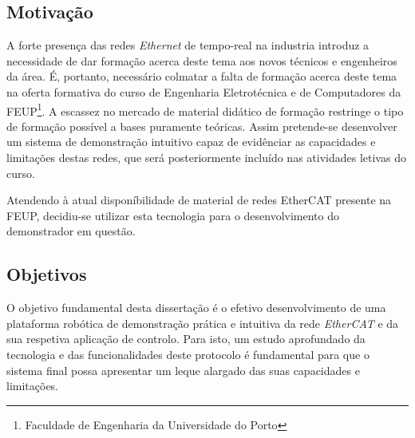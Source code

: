 % 

\subsection{Motivação}\label{sec:motivacao}

A forte presença das redes \textit{Ethernet} de tempo-real na industria introduz a necessidade de dar formação acerca deste tema aos novos técnicos e engenheiros da área.
É, portanto, necessário colmatar a falta de formação acerca deste tema na oferta formativa do curso de Engenharia Eletrotécnica e de Computadores da FEUP\footnote{Faculdade de Engenharia da Universidade do Porto}.
A escassez no mercado de material didático de formação restringe o tipo de formação possível a bases puramente teóricas.
Assim pretende-se desenvolver um sistema de demonstração intuitivo capaz de evidênciar as capacidades e limitações destas redes, que será posteriormente incluído nas atividades letivas do curso.

Atendendo à atual disponíbilidade de material de redes EtherCAT presente na FEUP, decidiu-se utilizar esta tecnologia para o desenvolvimento do demonstrador em questão. 

% 
% 


\subsection{Objetivos}\label{sec:objetivos}

O objetivo fundamental desta dissertação é o efetivo desenvolvimento de uma plataforma robótica de demonstração prática e intuitiva da rede \textit{EtherCAT} e da sua
respetiva aplicação de controlo.
Para isto, um estudo aprofundado da tecnologia e das funcionalidades deste protocolo é fundamental para que o sistema final possa apresentar um leque alargado
das suas capacidades e limitações.

